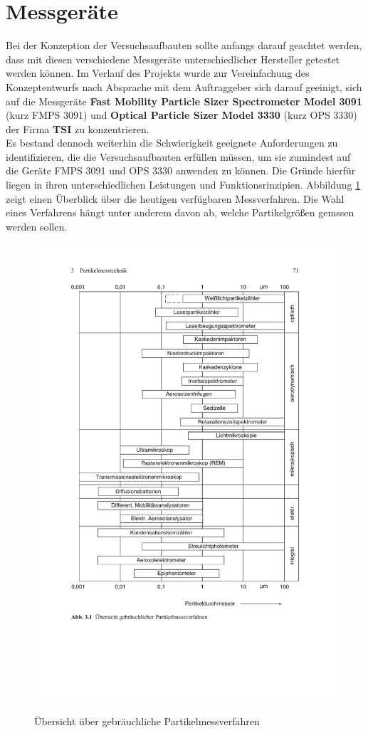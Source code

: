 \section{Messger\"{a}te}
Bei der Konzeption der Versuchsaufbauten sollte anfangs darauf geachtet werden, dass mit diesen verschiedene Messger\"{a}te unterschiedlicher Hersteller getestet werden k\"{o}nnen. Im Verlauf des Projekts wurde zur Vereinfachung des Konzeptentwurfs nach Absprache mit dem Auftraggeber sich darauf geeinigt, sich auf die Messger\"{a}te \textbf{Fast Mobility Particle Sizer Spectrometer Model 3091} (kurz FMPS 3091) und \textbf{Optical Particle Sizer Model 3330} (kurz OPS 3330) der Firma \textbf{TSI} zu konzentrieren. 
\\
Es bestand dennoch weiterhin die Schwierigkeit geeignete Anforderungen zu identifizieren, die die Versuchsaufbauten erf\"{u}llen m\"{u}ssen, um sie zumindest auf die Ger\"{a}te FMPS 3091 und OPS 3330 anwenden zu k\"{o}nnen. Die Gr\"{u}nde hierf\"{u}r liegen in ihren unterschiedlichen Leistungen und Funktionsrinzipien. Abbildung \ref{fig:verfahren} zeigt einen \"{U}berblick \"{u}ber die heutigen verf\"{u}gbaren Messverfahren. Die Wahl eines Verfahrens h\"{a}ngt unter anderem davon ab, welche Partikelgr\"{o}{\ss}en gemssen werden sollen. 
\begin{figure}[H]
	\myfloatalign
	{\includegraphics[width=.6\linewidth]{gfx/measuring_dev/partikelmessverfahren.pdf}} \quad
	\caption[\"{U}bersicht \"{u}ber gebr\"{a}uchliche Partikelmessverfahren\cite{reinraum}]
	{\"{U}bersicht \"{u}ber gebr\"{a}uchliche Partikelmessverfahren\cite{reinraum}}
	\label{fig:verfahren}
\end{figure}
